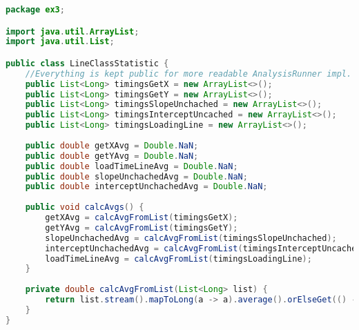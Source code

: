 \begin{lstlisting}[language=java,
    label=lst:lcs,
    caption=LineClassStatistics which hold all timings statistics corresponding to one single line class
]
package ex3;

import java.util.ArrayList;
import java.util.List;

public class LineClassStatistic {
	//Everything is kept public for more readable AnalysisRunner impl. This is normally a bad idea but not mission critical this time
	public List<Long> timingsGetX = new ArrayList<>();
	public List<Long> timingsGetY = new ArrayList<>();
	public List<Long> timingsSlopeUnchached = new ArrayList<>();
	public List<Long> timingsInterceptUncached = new ArrayList<>();
	public List<Long> timingsLoadingLine = new ArrayList<>();
	
	public double getXAvg = Double.NaN;
	public double getYAvg = Double.NaN;
	public double loadTimeLineAvg = Double.NaN;
	public double slopeUnchachedAvg = Double.NaN;
	public double interceptUnchachedAvg = Double.NaN;
	
	public void calcAvgs() {
		getXAvg = calcAvgFromList(timingsGetX);
		getYAvg = calcAvgFromList(timingsGetY);
		slopeUnchachedAvg = calcAvgFromList(timingsSlopeUnchached);
		interceptUnchachedAvg = calcAvgFromList(timingsInterceptUncached);
		loadTimeLineAvg = calcAvgFromList(timingsLoadingLine);
	}
	
	private double calcAvgFromList(List<Long> list) {
		return list.stream().mapToLong(a -> a).average().orElseGet(() -> Double.NaN);
	}
}
\end{lstlisting}